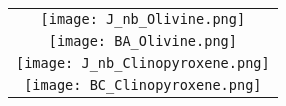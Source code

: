 \documentclass{article}
\begin{document}
\newpage

\begin{tabular}{c}
\texttt{[image: J\_nb\_Olivine.png]}
\\
\texttt{[image: BA\_Olivine.png]}
\\
\texttt{[image: J\_nb\_Clinopyroxene.png]}
\\
\texttt{[image: BC\_Clinopyroxene.png]}
\end{tabular}
\end{document}
